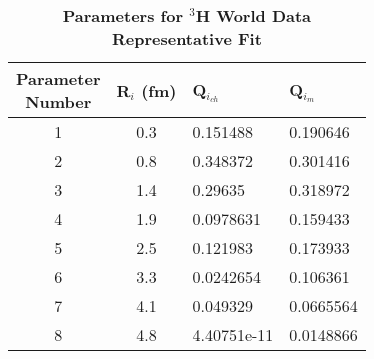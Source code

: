 \begin{table}[!h]
\centering
\begin{tabular}{|c c l l|}
\hline
\makecell{\textbf{Parameter}\\ \textbf{Number}} & \textbf{R$_i$ (fm)} & \textbf{Q$_{i_{ch}}$} & \textbf{Q$_{i_{m}}$}\\
\hline
1 & 0.3 & 0.151488 & 0.190646 \\
2 & 0.8 & 0.348372 & 0.301416 \\
3 & 1.4 & 0.29635 & 0.318972 \\
4 & 1.9 & 0.0978631 & 0.159433 \\
5 & 2.5 & 0.121983 & 0.173933 \\
6 & 3.3 & 0.0242654 & 0.106361 \\
7 & 4.1 & 0.049329 & 0.0665564 \\
8 & 4.8 & 4.40751e-11 & 0.0148866 \\          
\hline
\end{tabular}
\caption{\bf{Parameters for $^3$H World Data Representative Fit}}
\label{tab:3h_rep_fit_pars}
\end{table}


